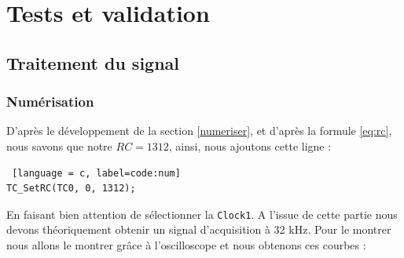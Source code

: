 \documentclass[a4paper,11pt]{article}
\begin{document}
\section{Tests et validation}
	
\subsection{Traitement du signal}

\subsubsection{Numérisation}
D'après le développement de la section \ref{numeriser}, et d'après la formule \ref{eq:rc}, nous savons que notre $RC = 1312$, ainsi, nous ajoutons cette ligne : 
\begin{lstlisting} [language = c, label=code:num]
TC_SetRC(TC0, 0, 1312);
\end{lstlisting}
En faisant bien attention de sélectionner la \texttt{Clock1}. A l'issue de cette partie nous devons théoriquement obtenir un signal d'acquisition à 32 kHz. Pour le montrer nous allons le montrer grâce à l'oscilloscope et nous obtenons ces courbes : 
\end{document}
